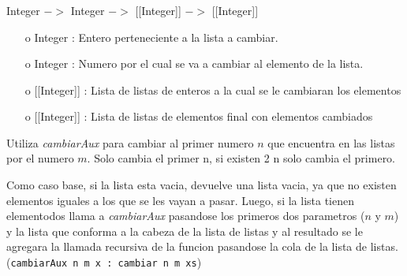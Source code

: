 \documentclass[10pt,journal]{IEEEtran}
\begin{document}
\subsubsection{\color{Red}{cambiar}}
\begin{description}[style=nextline]
        \item[\color{Green}{Signatura}] Integer $->$ Integer $->$ [[Integer]] $->$ [[Integer]]
        \begin{itemize} 
        \item [o]  Integer : Entero perteneciente a la lista a cambiar. 
        \item [o]  Integer : Numero por el cual se va a cambiar al elemento de la lista.  
        \item [o] [[Integer]] : Lista de listas de enteros a la cual se le cambiaran los elementos 
        \item [o] [[Integer]] : Lista de listas de elementos final con elementos cambiados 
        \end{itemize}        
        
        \item[\color{Green}{Descripción}] Utiliza \textit{cambiarAux} para cambiar al primer numero $n$
  que encuentra en las listas por el numero $m$. Solo 
  cambia el primer n, si existen 2 n solo cambia el primero.
  
  Como caso base, si la lista esta vacia, devuelve una lista vacia, ya que no existen elementos iguales a los que se les vayan a pasar. Luego, si la lista tienen elementodos llama a \textit{cambiarAux} pasandose los primeros dos parametros ($n$ y $m$) y la lista que conforma a la cabeza de la lista de listas y al resultado se le agregara la llamada recursiva de la funcion pasandose la cola de la lista de listas. (\texttt{cambiarAux n m x : cambiar n m xs})
    
\end{description}
\end{document}
